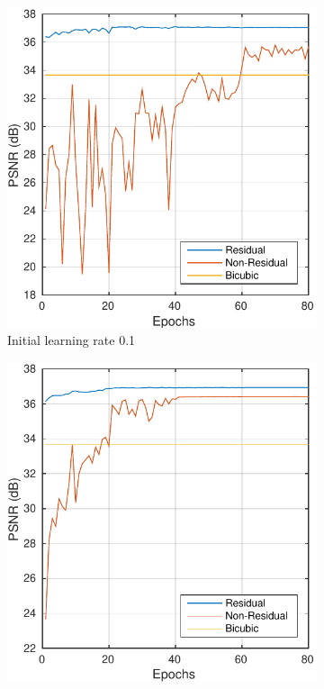 \documentclass[10pt,twocolumn,letterpaper]{article}
\begin{document}
\begin{figure}[t]
	\centering
	\begin{subfigure}{0.3\textwidth}
		\includegraphics[width=\textwidth]{figs/residual_exp0}
		\caption{Initial learning rate 0.1}
		\label{fig:gull}
	\end{subfigure}%
	\hfill
	\begin{subfigure}{0.3\textwidth}
		\includegraphics[width=\textwidth]{figs/residual_exp1}

\end{subfigure}
\end{figure}
\end{document}
